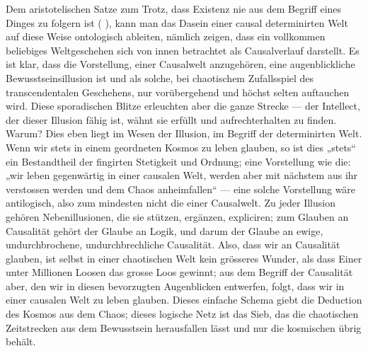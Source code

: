 Dem aristotelischen Satze zum Trotz, dass Existenz nie aus dem Begriff eines Dinges zu folgern ist (    ), kann man das Dasein einer causal determinirten Welt auf diese Weise ontologisch ableiten, nämlich zeigen, dass ein vollkommen beliebiges Weltgeschehen sich von innen betrachtet als Causalverlauf darstellt. Es ist klar, dass die Vorstellung, einer Causalwelt anzugehören, eine augenblickliche Bewusstseinsillusion ist und als solche, bei chaotischem Zufallsspiel des transcendentalen Geschehens, nur vorübergehend und höchst selten auftauchen wird. Diese sporadischen Blitze erleuchten aber die ganze Strecke — der Intellect, der dieser Illusion fähig ist, wähnt sie  erfüllt und aufrechterhalten zu finden. Warum? Dies eben liegt im Wesen der Illusion, im Begriff der determinirten Welt. Wenn wir stets in einem geordneten Kosmos zu leben glauben, so ist dies „stets“ ein Bestandtheil der fingirten Stetigkeit und Ordnung; eine Vorstellung wie die: „wir leben gegenwärtig in einer causalen Welt, werden aber mit nächstem aus ihr verstossen werden und dem Chaos anheimfallen“ — eine solche Vorstellung wäre antilogisch, also zum mindesten nicht die einer Causalwelt. Zu jeder Illusion gehören Nebenillusionen, die sie stützen, ergänzen, expliciren; zum Glauben an Causalität gehört der Glaube an Logik, und darum der Glaube an ewige, undurchbrochene, undurchbrechliche Causalität. Also, dass wir  an Causalität glauben, ist selbst in einer chaotischen Welt kein grösseres Wunder, als dass Einer unter Millionen Loosen das grosse Loos gewinnt; aus dem Begriff der Causalität aber, den wir in diesen bevorzugten Augenblicken entwerfen, folgt, dass wir  in einer causalen Welt zu leben glauben. Dieses einfache Schema giebt die Deduction des Kosmos aus dem Chaos; dieses logische Netz ist das Sieb, das die chaotischen Zeitstrecken aus dem Bewusstsein herausfallen lässt und nur die kosmischen übrig behält.
\par

